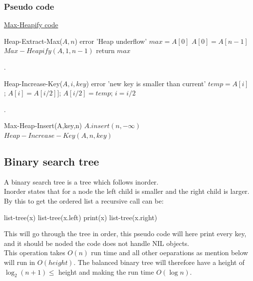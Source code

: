 \documentclass[12pt, a4paper]{article}
\begin{document}
				\subsubsection{Pseudo code}
					\hyperref[code:MaxHeapify]{Max-Heapify code}
				\begin{algorithmic}[1]
					\State Heap-Extract-Max($A,n$)
						\State error 'Heap underflow'
					\EndIf
					\State $max = A[0]$
					\State $A[0] = A[n-1]$
					\State $Max-Heapify(A,1,n-1)$
					\State return $max$
				\end{algorithmic}
				.\\[3mm]
				\begin{algorithmic}[1]
					\State Heap-Increase-Key($A,i,key$)
						\State error 'new key is smaller than current'
					\EndIf
							\State $temp = A[i]$;
							\State $A[i] = A[i/2]]$;
							\State $A[i/2] = temp$;
							\State $i=i/2$
					\EndWhile
					\end{algorithmic}
				.\\[3mm]
					\begin{algorithmic}[1]
						\State Max-Heap-Insert(A,key,n)
						\State $A.insert(n,-\infty)$
						\State $Heap-Increase-Key(A,n,key)$
					\end{algorithmic}
			\subsection{Binary search tree}
				A binary search tree is a tree which follows inorder.\\
				Inorder states that for a node the left child is smaller and the right child is larger.\\
				By this to get the ordered list a recursive call can be:
				\begin{algorithmic}[1]
					\State list-tree(x)
					\State list-tree(x.left)
					\State print(x)
					\State list-tree(x.right)
				\end{algorithmic}
				This will go through the tree in order, this pseudo code will here print every key, and it should be noded the code does not handle NIL objects.\\
				This operation takes $O(n)$ run time and all other oeparations as mention below will run in $O(height)$. The balanced binary tree will therefore have a height of $\log_2 (n+1) \leq $ height and making the run time $O(\log n)$.
\end{document}
